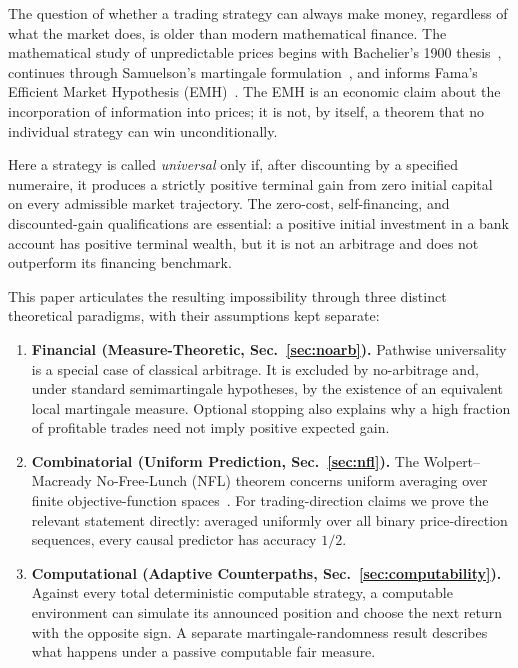 \documentclass[aps,pra,reprint,superscriptaddress,amsmath,amssymb]{revtex4-2}
\theoremstyle{plain}
\theoremstyle{definition}
\theoremstyle{remark}
\begin{document}
The question of whether a trading strategy can always make money, regardless
of what the market does, is older than modern mathematical finance. The
mathematical study of unpredictable prices begins with Bachelier's 1900
thesis~\cite{Bachelier1900}, continues through Samuelson's martingale
formulation~\cite{Samuelson1965}, and informs Fama's Efficient Market
Hypothesis (EMH)~\cite{Fama1970}. The EMH is an economic claim about the
incorporation of information into prices; it is not, by itself, a theorem that
no individual strategy can win unconditionally.

Here a strategy is called \emph{universal} only if, after discounting by a
specified numeraire, it produces a strictly positive terminal gain from zero
initial capital on every admissible market trajectory. The zero-cost,
self-financing, and discounted-gain qualifications are essential: a positive
initial investment in a bank account has positive terminal wealth, but it is
not an arbitrage and does not outperform its financing benchmark.

This paper articulates the resulting impossibility through three distinct
theoretical paradigms, with their assumptions kept separate:

\begin{enumerate}
  \item \textbf{Financial (Measure-Theoretic, Sec.~\ref{sec:noarb}).}
  Pathwise universality is a special case of classical arbitrage. It is
  excluded by no-arbitrage and, under standard semimartingale hypotheses, by
  the existence of an equivalent local martingale measure. Optional stopping
  also explains why a high fraction of profitable trades need not imply
  positive expected gain.

  \item \textbf{Combinatorial (Uniform Prediction, Sec.~\ref{sec:nfl}).}
  The Wolpert--Macready No-Free-Lunch (NFL) theorem concerns uniform averaging
  over finite objective-function spaces~\cite{Wolpert:1997:NFL:2221336.2221408}.
  For trading-direction claims we prove the relevant statement directly:
  averaged uniformly over all binary price-direction sequences, every causal
  predictor has accuracy \(1/2\).

  \item \textbf{Computational (Adaptive Counterpaths,
  Sec.~\ref{sec:computability}).} Against every total deterministic computable
  strategy, a computable environment can simulate its announced position and
  choose the next return with the opposite sign. A separate
  martingale-randomness result describes what happens under a passive
  computable fair measure.
\end{enumerate}
\end{document}
